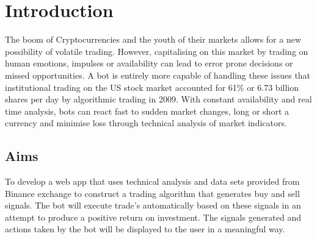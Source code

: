 
\chapter{Introduction}
\label{sec:intro}


The boom of Cryptocurrencies and the youth of their markets allows for a new possibility of volatile trading. However, capitalising on this market by trading on human emotions, impulses or availability can lead to error prone decisions or missed opportunities. A bot is entirely more capable of handling these issues that institutional trading on the US stock market accounted for 61\% or 6.73 billion shares \cite{WEB:Cheng:2017} per day by algorithmic trading in 2009. With constant availability and real time analysis, bots can react fast to sudden market changes, long or short a currency and minimise loss through technical analysis of market indicators. \par






\section{Aims}
\label{sec:intro:aims}
To develop a web app that uses technical analysis and data sets provided from Binance exchange to construct a trading algorithm that generates buy and sell signals. The bot will execute trade's automatically based on these signals in an attempt to produce a positive return on investment. The signals generated and actions taken by the bot will be displayed to the user in a meaningful way.


